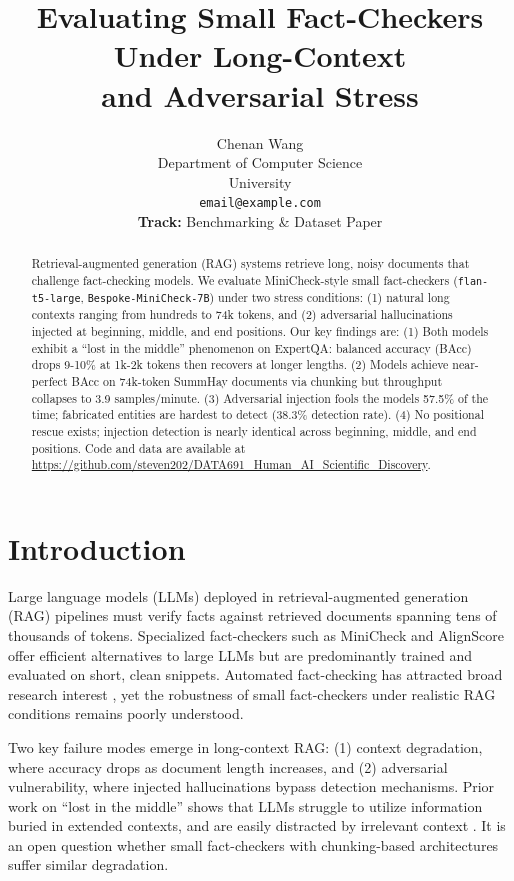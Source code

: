 \documentclass{article}
\title{Evaluating Small Fact-Checkers Under Long-Context\\and Adversarial Stress}
\author{
  Chenan Wang \\
  Department of Computer Science\\
  University\\
  \texttt{email@example.com} \\[4pt]
  \textbf{Track:} Benchmarking \& Dataset Paper
}
\begin{document}
\maketitle

\begin{abstract}
Retrieval-augmented generation (RAG) systems retrieve long, noisy documents that challenge fact-checking models. We evaluate MiniCheck-style small fact-checkers (\texttt{flan-t5-large}, \texttt{Bespoke-MiniCheck-7B}) under two stress conditions: (1) natural long contexts ranging from hundreds to 74k tokens, and (2) adversarial hallucinations injected at beginning, middle, and end positions. Our key findings are: (1) Both models exhibit a ``lost in the middle'' phenomenon on ExpertQA: balanced accuracy (BAcc) drops 9-10\% at 1k-2k tokens then recovers at longer lengths. (2) Models achieve near-perfect BAcc on 74k-token SummHay documents via chunking but throughput collapses to 3.9 samples/minute. (3) Adversarial injection fools the models 57.5\% of the time; fabricated entities are hardest to detect (38.3\% detection rate). (4) No positional rescue exists; injection detection is nearly identical across beginning, middle, and end positions. Code and data are available at \url{https://github.com/steven202/DATA691_Human_AI_Scientific_Discovery}.
\end{abstract}

\section{Introduction}

Large language models (LLMs) deployed in retrieval-augmented generation (RAG) pipelines \citep{lewis2020retrieval,gao2023retrieval} must verify facts against retrieved documents spanning tens of thousands of tokens. Specialized fact-checkers such as MiniCheck \citep{tang2024minicheck} and AlignScore \citep{zha2023alignscore} offer efficient alternatives to large LLMs but are predominantly trained and evaluated on short, clean snippets. Automated fact-checking has attracted broad research interest \citep{guo2022survey,vykopal2024generative}, yet the robustness of small fact-checkers under realistic RAG conditions remains poorly understood.

Two key failure modes emerge in long-context RAG: (1) context degradation, where accuracy drops as document length increases, and (2) adversarial vulnerability, where injected hallucinations \citep{huang2023survey} bypass detection mechanisms. Prior work on ``lost in the middle'' \citep{laban2024lost} shows that LLMs struggle to utilize information buried in extended contexts, and are easily distracted by irrelevant context \citep{shi2023large}. It is an open question whether small fact-checkers with chunking-based architectures suffer similar degradation.
\end{document}
